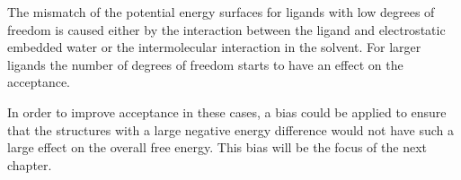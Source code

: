 The mismatch of the potential energy surfaces for ligands with low degrees of freedom is caused either by the interaction between the ligand and electrostatic embedded water or the intermolecular interaction in the solvent.  For larger ligands the number of degrees of freedom starts to have an effect on the acceptance.  

In order to improve acceptance in these cases, a bias could be applied to ensure that the structures with a large negative energy difference would not have such a large effect on the overall free energy.  This bias will be the focus of the next chapter.









